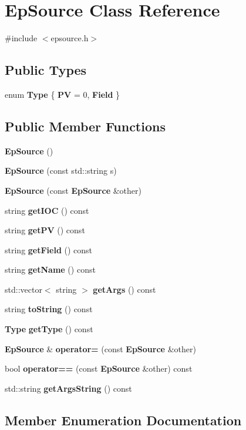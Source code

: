 \section{Ep\+Source Class Reference}
\label{classEpSource}


{\ttfamily \#include $<$epsource.\+h$>$}

\subsection*{Public Types}
\begin{DoxyCompactItemize}
\item 
enum \textbf{ Type} \{ \textbf{ PV} = 0, 
\textbf{ Field}
 \}
\end{DoxyCompactItemize}
\subsection*{Public Member Functions}
\begin{DoxyCompactItemize}
\item 
\textbf{ Ep\+Source} ()
\item 
\textbf{ Ep\+Source} (const std\+::string s)
\item 
\textbf{ Ep\+Source} (const \textbf{ Ep\+Source} \&other)
\item 
string \textbf{ get\+I\+OC} () const
\item 
string \textbf{ get\+PV} () const
\item 
string \textbf{ get\+Field} () const
\item 
string \textbf{ get\+Name} () const
\item 
std\+::vector$<$ string $>$ \textbf{ get\+Args} () const
\item 
string \textbf{ to\+String} () const
\item 
\textbf{ Type} \textbf{ get\+Type} () const
\item 
\textbf{ Ep\+Source} \& \textbf{ operator=} (const \textbf{ Ep\+Source} \&other)
\item 
bool \textbf{ operator==} (const \textbf{ Ep\+Source} \&other) const
\item 
std\+::string \textbf{ get\+Args\+String} () const
\end{DoxyCompactItemize}


\subsection{Member Enumeration Documentation}
\mbox{\label{classEpSource_a85c6c6f7a918fdf85359a347cfe209a5}} 
